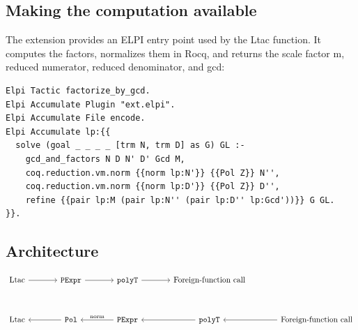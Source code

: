 \documentclass[11pt]{article}
\begin{document}




\newpage
\subsection{Making the computation available}
The extension provides an ELPI entry point used by the Ltac function. It computes
the factors, normalizes them in Rocq, and returns the scale factor m,
reduced numerator, reduced denominator, and gcd:
\begin{lstlisting}
Elpi Tactic factorize_by_gcd.
Elpi Accumulate Plugin "ext.elpi".
Elpi Accumulate File encode.
Elpi Accumulate lp:{{
  solve (goal _ _ _ _ [trm N, trm D] as G) GL :-
    gcd_and_factors N D N' D' Gcd M,
    coq.reduction.vm.norm {{norm lp:N'}} {{Pol Z}} N'',
    coq.reduction.vm.norm {{norm lp:D'}} {{Pol Z}} D'',
    refine {{pair lp:M (pair lp:N'' (pair lp:D'' lp:Gcd'))}} G GL.
}}.

\end{lstlisting}
\subsection{Architecture}
\[
\begin{tikzcd}[column sep=large]
\text{Ltac}
  \arrow[r] &
\texttt{PExpr}
  \arrow[r] &
\texttt{polyT}
  \arrow[r] &
\text{Foreign-function call}
\\[1.5em]
\text{Ltac} &
\texttt{Pol}
  \arrow[l]
&
\texttt{PExpr}
  \arrow[l, "\text{norm}"']
&
\texttt{polyT}
  \arrow[l]
  &
\text{Foreign-function call}
  \arrow[l]
\end{tikzcd}
\]
\end{document}
